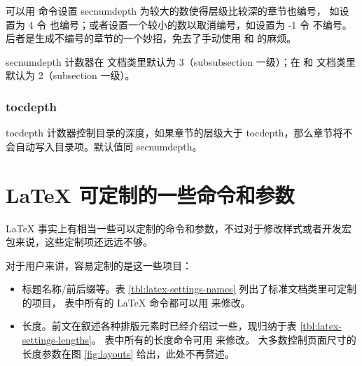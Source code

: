 可以用  命令设置 secnumdepth 为较大的数使得层级比较深的章节也编号，
如设置为 4 令  也编号；或者设置一个较小的数以取消编号，如设置为 -1 令  不编号。
后者是生成不编号的章节的一个妙招，免去了手动使用  和  的麻烦。

secnumdepth 计数器在  文档类里默认为 3（subsubsection 一级）；在  和  文档类里默认为 2（subsection 一级）。

\subsubsection{tocdepth}

tocdepth 计数器控制目录的深度，如果章节的层级大于 tocdepth，那么章节将不会自动写入目录项。默认值同 secnumdepth。

\section{\LaTeX{} 可定制的一些命令和参数}\label{sec:latex-settings}

\LaTeX{} 事实上有相当一些可以定制的命令和参数，不过对于修改样式或者开发宏包来说，这些定制项还远远不够。

对于用户来讲，容易定制的是这一些项目：

\begin{itemize}
  \item 标题名称/前后缀等。表 \ref{tbl:latex-settings-names} 列出了标准文档类里可定制的项目，
  表中所有的 \LaTeX{} 命令都可以用  来修改。
  \item 长度。前文在叙述各种排版元素时已经介绍过一些，现归纳于表 \ref{tbl:latex-settings-lengths}。
  表中所有的长度命令可用  来修改。
  大多数控制页面尺寸的长度参数在图 \ref{fig:layouts} 给出，此处不再赘述。
\end{itemize}

